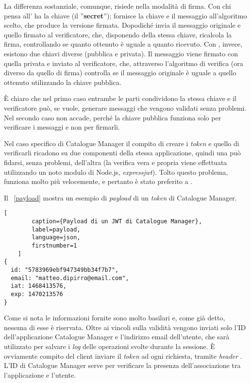 La differenza sostanziale, comunque, risiede nella modalità di firma. Con  chi pensa all' ha la chiave (il ''\textbf{secret}''); fornisce la chiave e il messaggio all'algoritmo scelto, che produce la versione firmata. Dopodiché invia il messaggio originale e quello firmato al verificatore, che, disponendo della stessa chiave, ricalcola la firma, controllando se quanto ottenuto è uguale a quanto ricevuto. Con , invece, esistono due chiavi diverse (pubblica e privata). Il messaggio viene firmato con quella privata e inviato al verificatore, che, attraverso l'algoritmo di verifica (ora diverso da quello di firma) controlla se il messaggio originale è uguale a quello ottenuto utilizzando la chiave pubblica. 

È chiaro che nel primo caso entrambe le parti condividono la stessa chiave e il verificatore può, se vuole, generare messaggi che vengono validati senza problemi. Nel secondo caso non accade, perché la chiave pubblica funziona solo per verificare i messaggi e non per firmarli.

Nel caso specifico di Catalogue Manager il compito di creare i \textit{token} e quello di verificarli ricadono su due componenti della stessa applicazione, quindi una può fidarsi, senza problemi, dell'altra (la verifica vera e propria viene effettuata utilizzando un noto modulo di Node.js, \textit{expressjwt}). Tolto questo problema,  funziona molto più velocemente, e pertanto è stato preferito a .

Il \lstlistingname~\ref{payload} mostra un esempio di \textit{payload} di un \textit{token} di Catalogue Manager.
\begin{lstlisting}[
		caption={Payload di un JWT di Catalogue Manager},
		label=payload,
		language=json,
		firstnumber=1
	]
{
  id: "5783969ebf947349bb34f7b7",
  email: "matteo.dipirro@email.com",
  iat: 1468413576,
  exp: 1470213576
}
\end{lstlisting}
Come si nota le informazioni fornite sono molto basilari e, come già detto, nessuna di esse è riservata. Oltre ai vincoli sulla validità vengono inviati solo l'ID dell'applicazione Catalogue Manager e l'indirizzo email dell'utente, che sarà utilizzato per salvare i \textit{log} delle operazioni svolte durante la sessione. È ovviamente compito del client inviare il \textit{token} ad ogni richiesta, tramite \textit{header} . L'ID di Catalogue Manager serve per verificare la presenza dell'associazione tra l'applicazione e l'utente.

